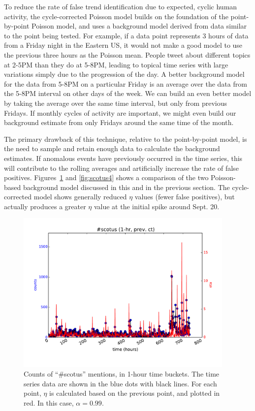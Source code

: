 \documentclass{article}
\begin{document}
To reduce the rate of false trend identification due to expected, cyclic human
activity, the cycle-corrected Poisson model builds on the foundation of the
point-by-point Poisson model, and uses a background model derived from data
similar to the point being tested. For example, if a data point represents 3
hours of data from a Friday night in the Eastern US, it would not make a good
model to use the previous three hours as the Poisson mean. People tweet about
different topics at 2-5PM than they do at 5-8PM, leading to topical time series
with large variations simply due to the progression of the day. A better
background model for the data from 5-8PM on a particular Friday is an average
over the data from the 5-8PM interval on other days of the week. We can build
an even better model by taking the average over the same time interval, but
only from previous Fridays. If monthly cycles of activity are important, we
might even build our background estimate from only Fridays around the same time
of the month. 

The primary drawback of this technique, relative to the point-by-point model,
is the need to sample and retain enough data to calculate the background
estimates. If anomalous events have previously occurred in the time series,
this will contribute to the rolling averages and artificially increase the rate
of false positives. Figures~\ref{fig:scotus3} and \ref{fig:scotus4} shows a comparison of the two Poisson-based
background model discussed in this and in the previous section. The
cycle-corrected model shows generally reduced $\eta$ values (fewer false
positives), but actually produces a greater $\eta$ value at the initial spike
around Sept. 20. 

\begin{figure}
\begin{center}
\includegraphics[width=0.95\textwidth]{fig/scotus_1month_pbppm.pdf}
\caption{Counts of ``\#scotus'' mentions, in 1-hour time buckets. The time series
data are shown in the blue dots with black lines. For each point, $\eta$ is
calculated based on the previous point, and plotted in red. In this case, 
$\alpha=0.99$.} \label{fig:scotus3}
\end{center}
\end{figure}
\end{document}
